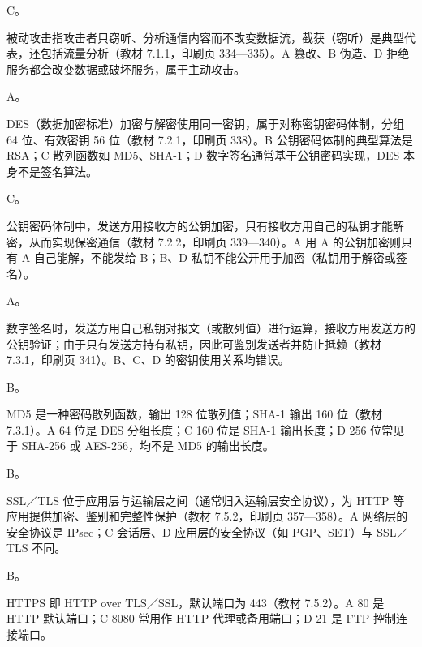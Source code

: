 \documentclass[a4paper,11pt]{article}
\begin{document}


\q C。\begin{analysis}被动攻击指攻击者只窃听、分析通信内容而不改变数据流，截获（窃听）是典型代表，还包括流量分析（教材 7.1.1，印刷页 334—335）。A 篡改、B 伪造、D 拒绝服务都会改变数据或破坏服务，属于主动攻击。\end{analysis}

\q A。\begin{analysis}DES（数据加密标准）加密与解密使用同一密钥，属于对称密钥密码体制，分组 64 位、有效密钥 56 位（教材 7.2.1，印刷页 338）。B 公钥密码体制的典型算法是 RSA；C 散列函数如 MD5、SHA-1；D 数字签名通常基于公钥密码实现，DES 本身不是签名算法。\end{analysis}

\q C。\begin{analysis}公钥密码体制中，发送方用接收方的公钥加密，只有接收方用自己的私钥才能解密，从而实现保密通信（教材 7.2.2，印刷页 339—340）。A 用 A 的公钥加密则只有 A 自己能解，不能发给 B；B、D 私钥不能公开用于加密（私钥用于解密或签名）。\end{analysis}

\q A。\begin{analysis}数字签名时，发送方用自己私钥对报文（或散列值）进行运算，接收方用发送方的公钥验证；由于只有发送方持有私钥，因此可鉴别发送者并防止抵赖（教材 7.3.1，印刷页 341）。B、C、D 的密钥使用关系均错误。\end{analysis}

\q B。\begin{analysis}MD5 是一种密码散列函数，输出 128 位散列值；SHA-1 输出 160 位（教材 7.3.1）。A 64 位是 DES 分组长度；C 160 位是 SHA-1 输出长度；D 256 位常见于 SHA-256 或 AES-256，均不是 MD5 的输出长度。\end{analysis}

\q B。\begin{analysis}SSL／TLS 位于应用层与运输层之间（通常归入运输层安全协议），为 HTTP 等应用提供加密、鉴别和完整性保护（教材 7.5.2，印刷页 357—358）。A 网络层的安全协议是 IPsec；C 会话层、D 应用层的安全协议（如 PGP、SET）与 SSL／TLS 不同。\end{analysis}

\q B。\begin{analysis}HTTPS 即 HTTP over TLS／SSL，默认端口为 443（教材 7.5.2）。A 80 是 HTTP 默认端口；C 8080 常用作 HTTP 代理或备用端口；D 21 是 FTP 控制连接端口。\end{analysis}
\end{document}
